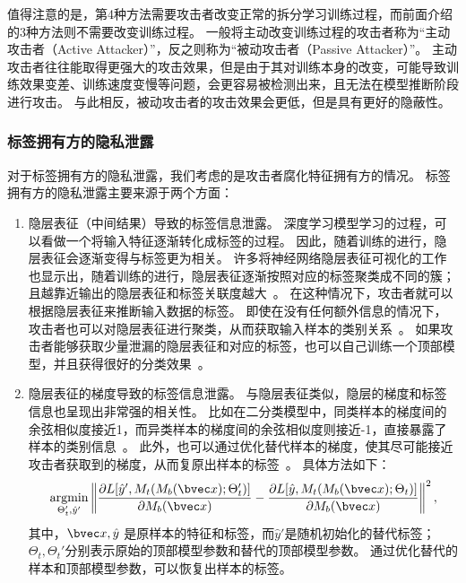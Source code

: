 值得注意的是，第4种方法需要攻击者改变正常的拆分学习训练过程，而前面介绍的3种方法则不需要改变训练过程。
%
一般将主动改变训练过程的攻击者称为“主动攻击者（Active Attacker）”，反之则称为“被动攻击者（Passive Attacker）”。
%
主动攻击者往往能取得更强大的攻击效果，但是由于其对训练本身的改变，可能导致训练效果变差、训练速度变慢等问题，会更容易被检测出来，且无法在模型推断阶段进行攻击。
与此相反，被动攻击者的攻击效果会更低，但是具有更好的隐蔽性。

\subsubsection{标签拥有方的隐私泄露}
对于标签拥有方的隐私泄露，我们考虑的是攻击者腐化特征拥有方的情况。
%
标签拥有方的隐私泄露主要来源于两个方面：
\begin{enumerate}[label=(\arabic*)]
    \item 隐层表征（中间结果）导致的标签信息泄露。
    深度学习模型学习的过程，可以看做一个将输入特征逐渐转化成标签的过程。
    因此，随着训练的进行，隐层表征会逐渐变得与标签更为相关。
    许多将神经网络隐层表征可视化的工作也显示出，随着训练的进行，隐层表征逐渐按照对应的标签聚类成不同的簇；且越靠近输出的隐层表征和标签关联度越大~\cite{paulo2017visualize_hidden,pezzotti2017deepeyes,cantareira2020hidden_vector_fields}。
    在这种情况下，攻击者就可以根据隐层表征来推断输入数据的标签。
    即使在没有任何额外信息的情况下，攻击者也可以对隐层表征进行聚类，从而获取输入样本的类别关系~\cite{liujunlin2022clustering_attack,liujunlin2023distance_attack}。
    如果攻击者能够获取少量泄漏的隐层表征和对应的标签，也可以自己训练一个顶部模型，并且获得很好的分类效果~\cite{fucong2022label_infer_attack}。
    \item 隐层表征的梯度导致的标签信息泄露。
    与隐层表征类似，隐层的梯度和标签信息也呈现出非常强的相关性。
    比如在二分类模型中，同类样本的梯度间的余弦相似度接近1，而异类样本的梯度间的余弦相似度则接近-1，直接暴露了样本的类别信息~\cite{oscarli2022label_defense_marvell}。
    此外，也可以通过优化替代样本的梯度，使其尽可能接近攻击者获取到的梯度，从而复原出样本的标签~\cite{erdogan2022unsplit}。
    具体方法如下：
    \begin{equation}
        \mathop{\text{argmin}}_{\Theta_t', \hat y'} \left\Vert \dfrac{\partial L[\hat y', M_t(M_b(\bvec x);\Theta_t')]}{\partial M_b(\bvec x)} - \dfrac{\partial L[\hat y, M_t(M_b(\bvec x);\Theta_t)]}{\partial M_b(\bvec x)} \right\Vert^2,
    \end{equation}
    其中，$\bvec x, \hat y$ 是原样本的特征和标签，而$\hat y'$是随机初始化的替代标签；$\Theta_t, \Theta_t'$分别表示原始的顶部模型参数和替代的顶部模型参数。
    通过优化替代的样本和顶部模型参数，可以恢复出样本的标签。
\end{enumerate}

